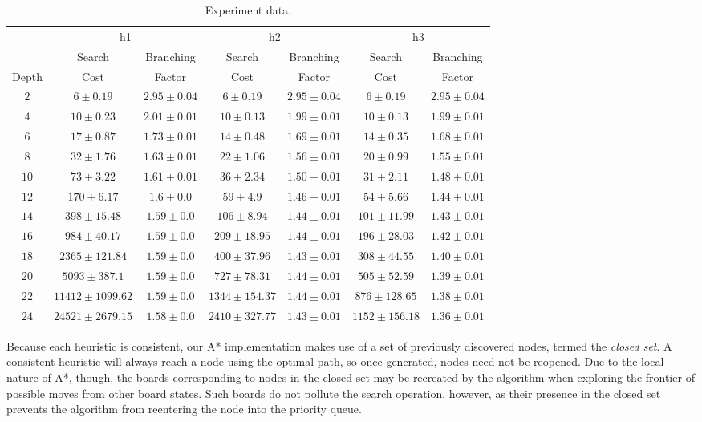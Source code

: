 \begin{table*}[ht]
  \centering
  \begin{tabular}{|c|cc|cc|cc|}
    \hline \hline %
    & \multicolumn{2}{c|}{h1} & \multicolumn{2}{c|}{h2} & \multicolumn{2}{c|}{h3} \\
    & Search & Branching & Search & Branching & Search & Branching \\
    Depth & Cost & Factor & Cost & Factor & Cost & Factor \\
    \hline %
    $2$ & $6\pm0.19$ & $2.95\pm0.04$ & $6\pm0.19$ & $2.95\pm0.04$ & $6\pm0.19$ & $2.95\pm0.04$ \\
    $4$ & $10\pm0.23$ & $2.01\pm0.01$ & $10\pm0.13$ & $1.99\pm0.01$ & $10\pm0.13$ & $1.99\pm0.01$ \\
    $6$ & $17\pm0.87$ & $1.73\pm0.01$ & $14\pm0.48$ & $1.69\pm0.01$ & $14\pm0.35$ & $1.68\pm0.01$ \\
    $8$ & $32\pm1.76$ & $1.63\pm0.01$ & $22\pm1.06$ & $1.56\pm0.01$ & $20\pm0.99$ & $1.55\pm0.01$ \\
    $10$ & $73\pm3.22$ & $1.61\pm0.01$ & $36\pm2.34$ & $1.50\pm0.01$ & $31\pm2.11$ & $1.48\pm0.01$ \\
    $12$ & $170\pm6.17$ & $1.6\pm0.0$ & $59\pm4.9$ & $1.46\pm0.01$ & $54\pm5.66$ & $1.44\pm0.01$ \\
    $14$ & $398\pm15.48$ & $1.59\pm0.0$ & $106\pm8.94$ & $1.44\pm0.01$ & $101\pm11.99$ & $1.43\pm0.01$ \\
    $16$ & $984\pm40.17$ & $1.59\pm0.0$ & $209\pm18.95$ & $1.44\pm0.01$ & $196\pm28.03$ & $1.42\pm0.01$ \\
    $18$ & $2365\pm121.84$ & $1.59\pm0.0$ & $400\pm37.96$ & $1.43\pm0.01$ & $308\pm44.55$ & $1.40\pm0.01$ \\
    $20$ & $5093\pm387.1$ & $1.59\pm0.0$ & $727\pm78.31$ & $1.44\pm0.01$ & $505\pm52.59$ & $1.39\pm0.01$ \\
    $22$ & $11412\pm1099.62$ & $1.59\pm0.0$ & $1344\pm154.37$ & $1.44\pm0.01$ & $876\pm128.65$ & $1.38\pm0.01$ \\
    $24$ & $24521\pm2679.15$ & $1.58\pm0.0$ & $2410\pm327.77$ & $1.43\pm0.01$ & $1152\pm156.18$ & $1.36\pm0.01$ \\        

    \hline \hline
  \end{tabular}
  
  \caption{Experiment data.}
  \label{tab:data}
\end{table*}

Because each heuristic is consistent, our A* implementation makes use of a set of previously discovered nodes, termed the \emph{closed set}.  A consistent heuristic will always reach a node using the optimal path, so once generated, nodes need not be reopened.  Due to the local nature of A*, though, the boards corresponding to nodes in the closed set may be recreated by the algorithm when exploring the frontier of possible moves from other board states.  Such boards do not pollute the search operation, however, as their presence in the closed set prevents the algorithm from reentering the node into the priority queue.

